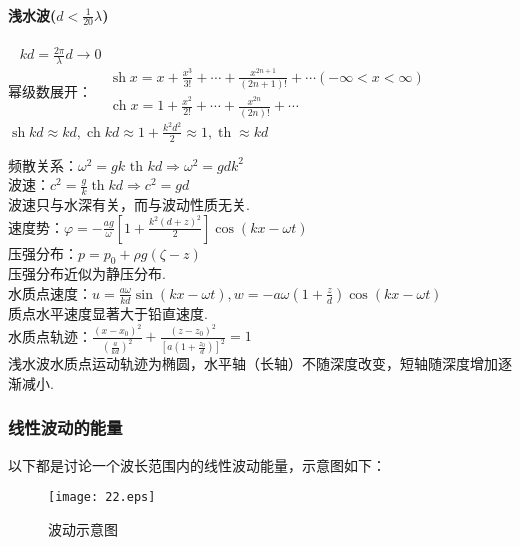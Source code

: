 \documentclass[a4paper,12pt]{article}
\begin{document}
    \paragraph{浅水波($d<\frac{1}{20}\lambda$)}~{}
    $\displaystyle kd=\frac{2\pi}{\lambda}d\rightarrow 0$\\
    幂级数展开：$\displaystyle \begin{aligned} &\operatorname{sh} x=x+\frac{x^{3}}{3 !}+\cdots+\frac{x^{2 n+1}}{(2 n+1) !}+\cdots(-\infty<x<\infty) \\
    &\operatorname{ch} x=1+\frac{x^{2}}{2 !}+\cdots+\frac{x^{2 n}}{(2 n) !}+\cdots\end{aligned}$\\
    $\displaystyle \operatorname{sh}kd\approx kd,\operatorname{ch}kd\approx 1+\frac{k^2 d^2}{2}\approx 1,\operatorname{th}\approx kd$\\
    \begin{spacing}{2}
        频散关系：$\displaystyle \omega^{2}=g k \text { th } k d \Rightarrow \omega^{2}=gd k^2$\\
    波速：$\displaystyle c^{2}=\frac{g}{k} \operatorname{th} k d \Rightarrow c^{2}=gd$\\
    波速只与水深有关，而与波动性质无关.\\
    速度势：$\displaystyle \varphi=-\frac{a g}{\omega}\left[1+\frac{k^{2}(d+z)^{2}}{2}\right] \cos (k x-\omega t)$\\
    压强分布：$p=p_0+\rho g(\zeta-z)$\\
    压强分布近似为静压分布.\\
    水质点速度：$\displaystyle u=\frac{a \omega}{k d} \sin (k x-\omega t) ,   w=-a \omega\left(1+\frac{z}{d}\right) \cos (k x-\omega t)$\\
    质点水平速度显著大于铅直速度.\\
    水质点轨迹：$\displaystyle \frac{\left(x-x_{0}\right)^{2}}{\left(\frac{a}{k d}\right)^{2}}+\frac{\left(z-z_{0}\right)^{2}}{\left[a\left(1+\frac{z_{0}}{d}\right)\right]^{2}}=1$\\
    浅水波水质点运动轨迹为椭圆，水平轴（长轴）不随深度改变，短轴随深度增加逐渐减小.
    \end{spacing}
    \begin{figure}[H]
        \centering 
        \caption*{}
    \end{figure}
    \subsubsection{线性波动的能量}
    以下都是讨论一个波长范围内的线性波动能量，示意图如下：
	\begin{figure}[H]
		\centering\texttt{[image: 22.eps]}
		\caption{波动示意图}\label{fig:2} 
	\end{figure}
\end{document}

